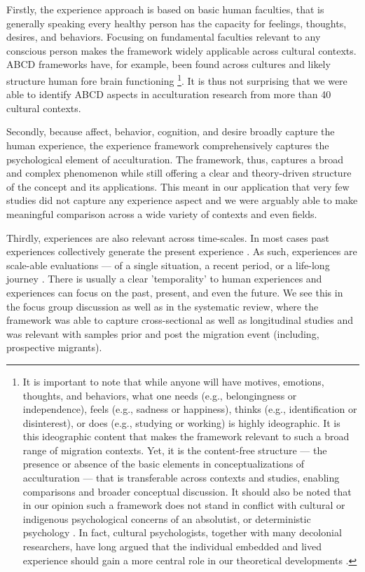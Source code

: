 \documentclass[man, 12pt, a4paper]{apa7}
\begin{document}
Firstly, the experience approach is based on basic human faculties, that is generally speaking every healthy person has the capacity for feelings, thoughts, desires, and behaviors. Focusing on fundamental faculties relevant to any conscious person makes the framework widely applicable across cultural contexts. ABCD frameworks have, for example, been found across cultures \citep[e.g.,][]{Bhawuk2011} and likely structure human fore brain functioning \citep{Swanson2020}\footnote{It is important to note that while anyone will have motives, emotions, thoughts, and behaviors, what one needs (e.g., belongingness or independence), feels (e.g., sadness or happiness), thinks (e.g., identification or disinterest), or does (e.g., studying or working) is highly ideographic. It is this ideographic content that makes the framework relevant to such a broad range of migration contexts. Yet, it is the content-free structure --- the presence or absence of the basic elements in conceptualizations of acculturation --- that is transferable across contexts and studies, enabling comparisons and broader conceptual discussion. It should also be noted that in our opinion such a framework does not stand in conflict with cultural or indigenous psychological concerns of an absolutist, or deterministic psychology \citep[e.g.,][]{Kim2006a}. In fact, cultural psychologists, together with many decolonial researchers, have long argued that the individual embedded and lived experience should gain a more central role in our theoretical developments \citep[e.g., ontological turn;][]{Pedersen2020}.}. It is thus not surprising that we were able to identify ABCD aspects in acculturation research from more than 40 cultural contexts.

Secondly, because affect, behavior, cognition, and desire broadly capture the human experience, the experience framework comprehensively captures the psychological element of acculturation. The framework, thus, captures a broad and complex phenomenon while still offering a clear and theory-driven structure of the concept and its applications. This meant in our application that very few studies did not capture any experience aspect and we were arguably able to make meaningful comparison across a wide variety of contexts and even fields.

Thirdly, experiences are also relevant across time-scales. In most cases past experiences collectively generate the present experience \citep[also see][]{Husserl1959, Heidegger1867}. As such, experiences are scale-able evaluations --- of a single situation, a recent period, or a life-long journey \citep[e.g.,][]{Clewett2019}. There is usually a clear 'temporality' to human experiences and experiences can focus on the past, present, and even the future. We see this in the focus group discussion as well as in the systematic review, where the framework was able to capture cross-sectional as well as longitudinal studies and was relevant with samples prior and post the migration event (including, prospective migrants). 
\end{document}
